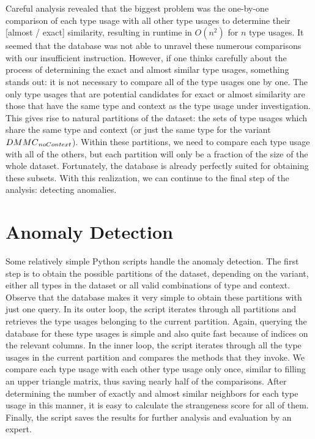 Careful analysis revealed that the biggest problem was the one-by-one comparison of each type usage with all other type usages to determine their [almost / exact] similarity, resulting in runtime in $O(n^2)$ for $n$ type usages.
It seemed that the database was not able to unravel these numerous comparisons with our insufficient instruction.
However, if one thinks carefully about the process of determining the exact and almost similar type usages, something stands out: it is not necessary to compare all of the type usages one by one.
The only type usages that are potential candidates for exact or almost similarity are those that have the same type and context as the type usage under investigation.
This gives rise to natural partitions of the dataset: the sets of type usages which share the same type and context (or just the same type for the variant $\mathnormal{DMMC}_\mathnormal{noContext}$).
Within these partitions, we need to compare each type usage with all of the others, but each partition will only be a fraction of the size of the whole dataset.
Fortunately, the database is already perfectly suited for obtaining these subsets.
With this realization, we can continue to the final step of the analysis: detecting anomalies.

\section{Anomaly Detection}\label{sec:anomaly}


Some relatively simple Python scripts handle the anomaly detection.
The first step is to obtain the possible partitions of the dataset, depending on the variant, either all types in the dataset or all valid combinations of type and context.
Observe that the database makes it very simple to obtain these partitions with just one query.
In its outer loop, the script iterates through all partitions and retrieves the type usages belonging to the current partition.
Again, querying the database for these type usages is simple and also quite fast because of indices on the relevant columns.
In the inner loop, the script iterates through all the type usages in the current partition and compares the methods that they invoke.
We compare each type usage with each other type usage only once, similar to filling an upper triangle matrix, thus saving nearly half of the comparisons.
After determining the number of exactly and almost similar neighbors for each type usage in this manner, it is easy to calculate the strangeness score for all of them.
Finally, the script saves the results for further analysis and evaluation by an expert.

